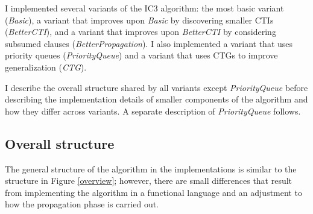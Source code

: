 \documentclass[12pt,a4paper,twoside,openright]{report}
\begin{document}
{{I implemented several variants of the IC3 algorithm:
the most basic variant (\emph{Basic}), a variant that
improves upon \emph{Basic} by discovering smaller CTIs (\emph{BetterCTI}),
and a variant that improves upon \emph{BetterCTI} by considering subsumed clauses
(\emph{BetterPropagation}).
I also implemented a variant that uses priority queues (\emph{PriorityQueue})
and a variant that uses CTGs to improve generalization (\emph{CTG}).

I describe the overall structure shared by all variants except
\emph{PriorityQueue} before describing the implementation
details of smaller components of the algorithm and how they differ across
variants. A separate description of \emph{PriorityQueue}
follows.

\subsection{Overall structure}

The general structure of the algorithm in the implementations is similar
to the structure in Figure \ref{overview}; however, there are
small differences that result from implementing the algorithm in a
functional language and an adjustment to how the propagation phase is
carried out.

}}
\end{document}

